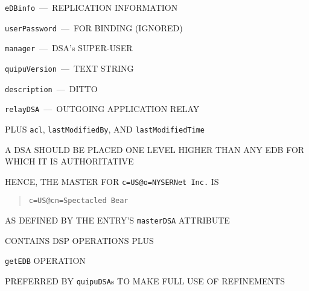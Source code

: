 \begin{bwslide}

\begin{nrtc}
\item	\verb"eDBinfo"~---~REPLICATION INFORMATION

\item	\verb"userPassword"~---~FOR BINDING (IGNORED)

\item	\verb"manager"~---~DSA's SUPER-USER

\item	\verb"quipuVersion"~---~TEXT STRING

\item	\verb"description"~---~DITTO

\item	\verb"relayDSA"~---~OUTGOING APPLICATION RELAY

\item	PLUS \verb"acl", \verb"lastModifiedBy", AND \verb"lastModifiedTime"
\end{nrtc}
\end{bwslide}


\begin{bwslide}

\begin{nrtc}
\item	A DSA SHOULD BE PLACED ONE LEVEL HIGHER THAN ANY EDB FOR WHICH IT IS
	AUTHORITATIVE

\item	HENCE, THE MASTER FOR \verb"c=US@o=NYSERNet Inc." IS
\end{nrtc}
\begin{quote}\small\begin{verbatim}
c=US@cn=Spectacled Bear
\end{verbatim}\end{quote}
	AS DEFINED BY THE ENTRY'S \verb"masterDSA" ATTRIBUTE
\end{bwslide}


\begin{bwslide}

\begin{nrtc}
\item	CONTAINS DSP OPERATIONS PLUS
    \begin{nrtc}
    \item	\verb"getEDB" OPERATION
    \end{nrtc}

\item	PREFERRED BY \verb"quipuDSA"s TO MAKE FULL USE OF REFINEMENTS
\end{nrtc}
\end{bwslide}


